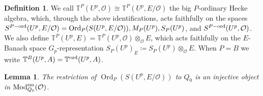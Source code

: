 \documentclass[leqno]{amsart}
\newtheorem{lem}[thm]{Lemma}
\theoremstyle{definition}
\newtheorem{defn}[thm]{Definition}
\theoremstyle{remark}
\newcommand{\oo}{\mathcal{O}}
\DeclareMathOperator{\Mod}{\textnormal{Mod}}
\DeclareMathOperator{\Ord}{Ord} %
\newcommand{\sm}{\textnormal{sm}}
\newcommand{\TT}{\mathbb{T}} %
\newcommand{\ord}{\textnormal{ord}} %
\begin{document}
\begin{defn}\label{def:big_hecke}
    We call $\TT^P(U^p,\oo)\cong \TT^P(U^p,E/\oo)$
	the big $P$-ordinary Hecke algebra,
    which, through the above identifications,
    acts faithfully on the spaces
	$S^{P-\ord}(U^p,E/\oo)=\Ord_P(S(U^p,E/\oo)), M_P(U^p), S_P(U^p)$,
	and $S^{P-\ord}(U^p,\oo)$. 
	We also define $\TT^P(U^p,E)=\TT^P(U^p,\oo)\otimes_{\oo}E$,
	which acts faithfully
	on the $E$-Banach space $G_p$-representation
    $S_P(U^p)_E\coloneqq S_P(U^p)\otimes_{\oo}E$.
    When $P=B$ we write 
    $\TT^B(U^p,A)=\TT^{\ord}(U^p,A)$.
\end{defn}


\begin{lem}\label{lem:inj}
	The restriction of
	$\Ord_P(S(U^p,E/\oo))$ to $Q_0$ 
	is an injective object
	in $\Mod^{\sm}_{Q_0}(\oo)$.
\end{lem}
\end{document}
